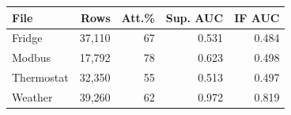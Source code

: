 \begin{tabular}{@{}lrrrr@{}}
\toprule
File & Rows & Att.\% & Sup. AUC & IF AUC \\
\midrule
Fridge & 37{,}110 & 67 & 0.531 & 0.484 \\
Modbus & 17{,}792 & 78 & 0.623 & 0.498 \\
Thermostat & 32{,}350 & 55 & 0.513 & 0.497 \\
Weather & 39{,}260 & 62 & 0.972 & 0.819 \\
\bottomrule
\end{tabular}